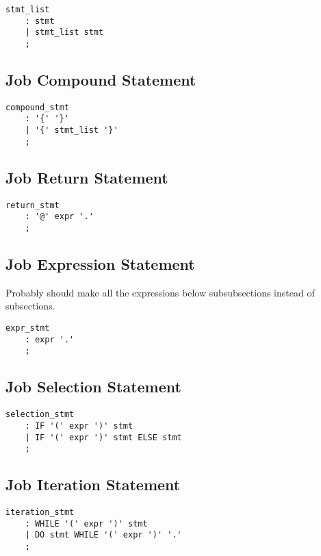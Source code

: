 \documentclass[prodmode,acmtecs]{acmsmall}
\begin{document}
\begin{lstlisting}
stmt_list
	: stmt
	| stmt_list stmt
	;
\end{lstlisting}


\subsection{Job Compound Statement}

\begin{lstlisting}
compound_stmt
	: '{' '}'
	| '{' stmt_list '}'
	;
\end{lstlisting}


\subsection{Job Return Statement}

\begin{lstlisting}
return_stmt
	: '@' expr '.'
	;

\end{lstlisting}


\subsection{Job Expression Statement}

Probably should make all the expressions below subsubsections instead of subsections.

\begin{lstlisting}
expr_stmt
	: expr '.'
	;
\end{lstlisting}


\subsection{Job Selection Statement}

\begin{lstlisting}
selection_stmt
	: IF '(' expr ')' stmt
	| IF '(' expr ')' stmt ELSE stmt
	;
\end{lstlisting}


\subsection{Job Iteration Statement}

\begin{lstlisting}
iteration_stmt
	: WHILE '(' expr ')' stmt
	| DO stmt WHILE '(' expr ')' '.'
	;
\end{lstlisting}
\end{document}
